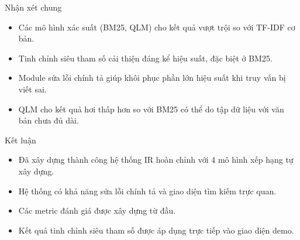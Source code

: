 \documentclass[aspectratio=169,11pt]{beamer}
\begin{document}
\begin{frame}{Nhận xét chung}
\begin{itemize}
    \item Các mô hình xác suất (BM25, QLM) cho kết quả vượt trội so với TF-IDF cơ bản.
    \item Tinh chỉnh siêu tham số cải thiện đáng kể hiệu suất, đặc biệt ở BM25.
    \item Module sửa lỗi chính tả giúp khôi phục phần lớn hiệu suất khi truy vấn bị viết sai.
    \item QLM cho kết quả hơi thấp hơn so với BM25 có thể do tập dữ liệu với văn bản chưa đủ dài.
\end{itemize}
\end{frame}

\begin{frame}{Kết luận}
\begin{itemize}
    \item Đã xây dựng thành công hệ thống IR hoàn chỉnh với 4 mô hình xếp hạng tự xây dựng.
    \item Hệ thống có khả năng sửa lỗi chính tả và giao diện tìm kiếm trực quan.
    \item Các metric đánh giá được xây dựng từ đầu.
    \item Kết quả tinh chỉnh siêu tham số được áp dụng trực tiếp vào giao diện demo.
\end{itemize}
\end{frame}
\end{document}
